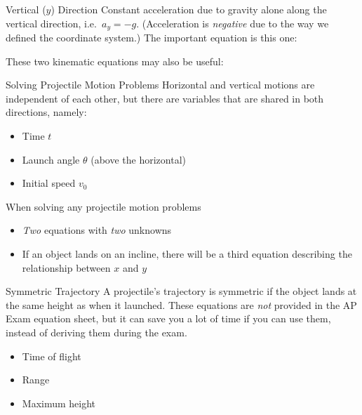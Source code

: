 \documentclass[12pt,compress,aspectratio=169,dvipsnames]{beamer}
\begin{document}
\begin{frame}{Vertical ($y$) Direction}
  Constant acceleration due to gravity alone along the vertical direction, i.e.\
  $a_y=-g$. (Acceleration is \emph{negative} due to the way we defined the
  coordinate system.) The important equation is this one:


  These two kinematic equations may also be useful:

  \vspace{-.2in}{\large
    \begin{align*}
      v_y &= \left[v_0\sin\theta\right] -gt\\
      v_y^2&=\left[v_0\sin\theta\right]^2-2gy
    \end{align*}
  }
\end{frame}



\begin{frame}{Solving Projectile Motion Problems}
  Horizontal and vertical motions are independent of each other, but there are
  variables that are shared in both directions, namely:
  \begin{itemize}
  \item Time $t$
  \item Launch angle $\theta$ (above the horizontal)
  \item Initial speed $v_0$
  \end{itemize}
  
  \vspace{.2in}When solving any projectile motion problems
  \begin{itemize}
  \item \emph{Two} equations with \emph{two} unknowns
  \item If an object lands on an incline, there will be a third equation
    describing the relationship between $x$ and $y$
  \end{itemize}
\end{frame}



\begin{frame}{Symmetric Trajectory}
  A projectile's trajectory is symmetric if the object lands at the same height
  as when it launched. These equations are \emph{not} provided in the AP Exam
  equation sheet, but it can save you a lot of time if you can use them, instead
  of deriving them during the exam.
  \begin{itemize}
  \item Time of flight
  \item Range
  \item Maximum height
  \end{itemize}
\end{frame}
\end{document}

